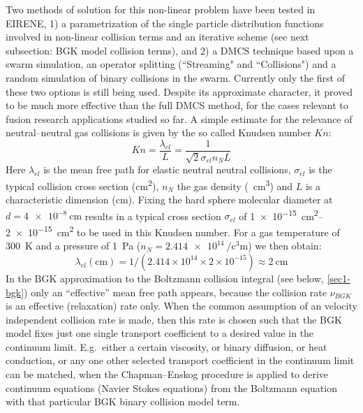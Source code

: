 Two methods of solution for this non-linear problem have been tested in EIRENE,
1) a parametrization of the single particle distribution functions involved in
non-linear collision terms and an iterative scheme (see next subsection:
\ac{BGK} model collision terms), and 2) a \ac{DMCS} technique based upon a
swarm simulation, an operator splitting (``Streaming" and ``Collisions") and a
random simulation of binary collisions in the swarm.
Currently only the first of these two options is still being used.
Despite its approximate character, it proved to be much more effective than the
full \ac{DMCS} method, for the cases relevant to fusion research applications
studied so far.
A simple estimate for the relevance of neutral--neutral gas collisions is given
by the so called Knudsen number $Kn$:
\begin{equation}
  Kn = \frac{\lambda_{el}}{L} = \frac{1}{\sqrt{2} \sigma_{el} n_N L}
\end{equation}
Here $\lambda_{el}$ is the mean free path for elastic neutral
neutral collisions, $\sigma_{el}$ is the typical collision cross section
(\si{\square\centi\metre}), $n_N$ the gas density (\si{\per\cubic\centi\metre})
and $L$ is a characteristic dimension (\si{\centi\metre}).
Fixing the hard sphere molecular diameter at $d=\SI{4e-8}{\centi\metre}$
results in a typical cross section $\sigma_{el}$ of
\SIrange{1e-15}{2e-15}{\square\centi\metre} to be used in this Knudsen number.
For a gas temperature  of \SI{300}{\kelvin} and a pressure of \SI{1}{\pascal}
($n_N=\SI{2.414e14}{\per\cubic\centi\metre}$) we then obtain:
\begin{equation}
  \lambda_{el}
  (\si{\centi\metre}) = 1/(2.414\times 10^{14}\times 2\times 10^{-15}) \approx
  \SI{2}{\centi\metre}
\end{equation}
In the \ac{BGK} approximation to the
Boltzmann collision integral (see below, \cref{sec1-bgk}) only an ``effective''
mean free path appears, because the collision rate $\nu_{BGK}$ is an effective
(relaxation) rate only.
When the common assumption of an velocity independent collision rate is made,
then this rate is chosen such that the \ac{BGK} model fixes just one single
transport coefficient to a desired value in the continuum limit.
E.g.\ either a certain viscosity, or  binary diffusion, or heat conduction, or
any one other selected transport coefficient in the continuum limit can be
matched, when the Chapman--Enskog procedure is applied to derive continuum
equations (Navier Stokes equations) from the Boltzmann equation with that
particular \ac{BGK} binary collision model term.

